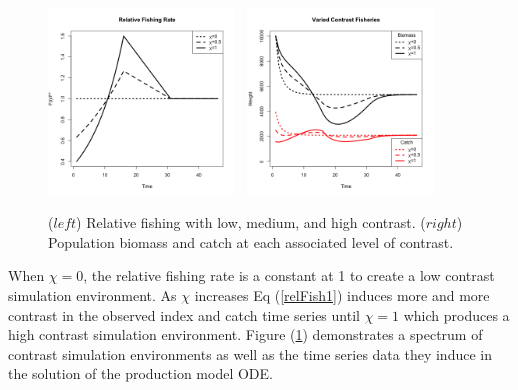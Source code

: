 \documentclass[12pt]{article}
\begin{document}
%
\begin{figure}[h!]
\centering
\includegraphics[width=0.44\textwidth]{../ptNew/relFish.png}
$~$
\includegraphics[width=0.44\textwidth]{../ptNew/relSeries.png}
\vspace{-1cm}
\caption{ \label{catchT45}
($left$) Relative fishing with low, medium, and high contrast.
($right$) Population biomass and catch at each associated level of contrast. %
}
\label{catch45}
\end{figure}
%
\clearpage
%
When $\chi=0$, the relative fishing rate is a constant at 1 to create a low 
contrast simulation environment. As $\chi$ increases Eq (\ref{relFish1}) 
induces more and more contrast in the observed index and catch time series 
until $\chi=1$ which produces a high contrast simulation environment. 
Figure (\ref{catch45}) demonstrates a spectrum of contrast simulation 
environments as well as the time series data they induce in the solution of 
the production model ODE. 

\end{document}
